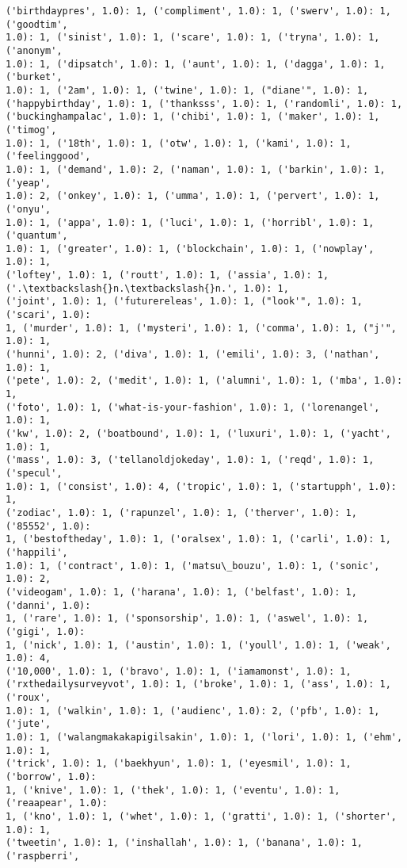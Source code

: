 \documentclass[11pt]{article}
\begin{document}
\begin{Verbatim}[commandchars=\\\{\}]
('birthdaypres', 1.0): 1, ('compliment', 1.0): 1, ('swerv', 1.0): 1, ('goodtim',
1.0): 1, ('sinist', 1.0): 1, ('scare', 1.0): 1, ('tryna', 1.0): 1, ('anonym',
1.0): 1, ('dipsatch', 1.0): 1, ('aunt', 1.0): 1, ('dagga', 1.0): 1, ('burket',
1.0): 1, ('2am', 1.0): 1, ('twine', 1.0): 1, ("diane'", 1.0): 1,
('happybirthday', 1.0): 1, ('thanksss', 1.0): 1, ('randomli', 1.0): 1,
('buckinghampalac', 1.0): 1, ('chibi', 1.0): 1, ('maker', 1.0): 1, ('timog',
1.0): 1, ('18th', 1.0): 1, ('otw', 1.0): 1, ('kami', 1.0): 1, ('feelinggood',
1.0): 1, ('demand', 1.0): 2, ('naman', 1.0): 1, ('barkin', 1.0): 1, ('yeap',
1.0): 2, ('onkey', 1.0): 1, ('umma', 1.0): 1, ('pervert', 1.0): 1, ('onyu',
1.0): 1, ('appa', 1.0): 1, ('luci', 1.0): 1, ('horribl', 1.0): 1, ('quantum',
1.0): 1, ('greater', 1.0): 1, ('blockchain', 1.0): 1, ('nowplay', 1.0): 1,
('loftey', 1.0): 1, ('routt', 1.0): 1, ('assia', 1.0): 1, ('.\textbackslash{}n.\textbackslash{}n.', 1.0): 1,
('joint', 1.0): 1, ('futurereleas', 1.0): 1, ("look'", 1.0): 1, ('scari', 1.0):
1, ('murder', 1.0): 1, ('mysteri', 1.0): 1, ('comma', 1.0): 1, ("j'", 1.0): 1,
('hunni', 1.0): 2, ('diva', 1.0): 1, ('emili', 1.0): 3, ('nathan', 1.0): 1,
('pete', 1.0): 2, ('medit', 1.0): 1, ('alumni', 1.0): 1, ('mba', 1.0): 1,
('foto', 1.0): 1, ('what-is-your-fashion', 1.0): 1, ('lorenangel', 1.0): 1,
('kw', 1.0): 2, ('boatbound', 1.0): 1, ('luxuri', 1.0): 1, ('yacht', 1.0): 1,
('mass', 1.0): 3, ('tellanoldjokeday', 1.0): 1, ('reqd', 1.0): 1, ('specul',
1.0): 1, ('consist', 1.0): 4, ('tropic', 1.0): 1, ('startupph', 1.0): 1,
('zodiac', 1.0): 1, ('rapunzel', 1.0): 1, ('therver', 1.0): 1, ('85552', 1.0):
1, ('bestoftheday', 1.0): 1, ('oralsex', 1.0): 1, ('carli', 1.0): 1, ('happili',
1.0): 1, ('contract', 1.0): 1, ('matsu\_bouzu', 1.0): 1, ('sonic', 1.0): 2,
('videogam', 1.0): 1, ('harana', 1.0): 1, ('belfast', 1.0): 1, ('danni', 1.0):
1, ('rare', 1.0): 1, ('sponsorship', 1.0): 1, ('aswel', 1.0): 1, ('gigi', 1.0):
1, ('nick', 1.0): 1, ('austin', 1.0): 1, ('youll', 1.0): 1, ('weak', 1.0): 4,
('10,000', 1.0): 1, ('bravo', 1.0): 1, ('iamamonst', 1.0): 1,
('rxthedailysurveyvot', 1.0): 1, ('broke', 1.0): 1, ('ass', 1.0): 1, ('roux',
1.0): 1, ('walkin', 1.0): 1, ('audienc', 1.0): 2, ('pfb', 1.0): 1, ('jute',
1.0): 1, ('walangmakakapigilsakin', 1.0): 1, ('lori', 1.0): 1, ('ehm', 1.0): 1,
('trick', 1.0): 1, ('baekhyun', 1.0): 1, ('eyesmil', 1.0): 1, ('borrow', 1.0):
1, ('knive', 1.0): 1, ('thek', 1.0): 1, ('eventu', 1.0): 1, ('reaapear', 1.0):
1, ('kno', 1.0): 1, ('whet', 1.0): 1, ('gratti', 1.0): 1, ('shorter', 1.0): 1,
('tweetin', 1.0): 1, ('inshallah', 1.0): 1, ('banana', 1.0): 1, ('raspberri',

\end{Verbatim}
\end{document}
